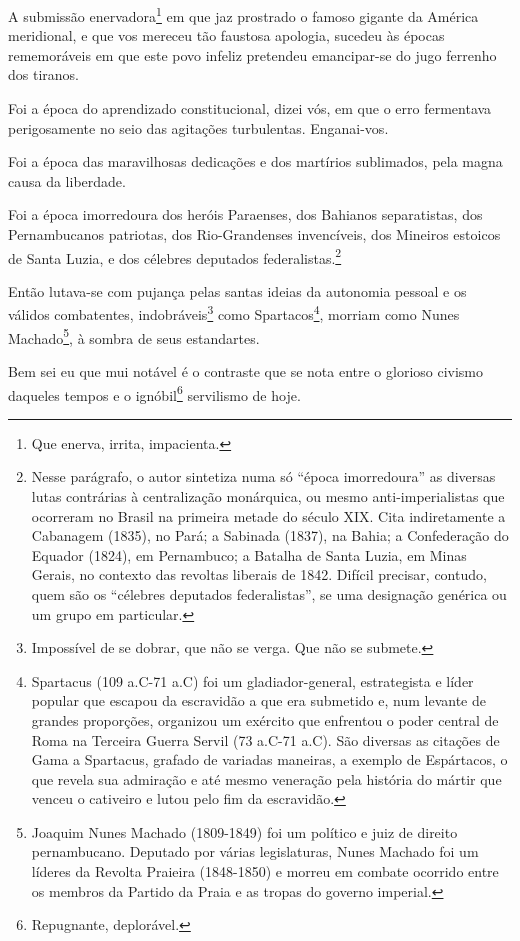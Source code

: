 A submissão enervadora\footnote{Que enerva, irrita, impacienta.} em
que jaz prostrado o famoso gigante da América meridional, e que vos
mereceu tão faustosa apologia, sucedeu às épocas rememoráveis em que
este povo infeliz pretendeu emancipar-se do jugo ferrenho dos tiranos.

Foi a época do aprendizado constitucional, dizei vós, em que o erro
fermentava perigosamente no seio das agitações turbulentas. Enganai-vos.

Foi a época das maravilhosas dedicações e dos martírios sublimados, pela
magna causa da liberdade.

Foi a época imorredoura dos heróis Paraenses, dos Bahianos separatistas,
dos Pernambucanos patriotas, dos Rio-Grandenses invencíveis, dos
Mineiros estoicos de Santa Luzia, e dos célebres deputados
federalistas.\footnote{Nesse parágrafo, o autor sintetiza numa só
  ``época imorredoura'' as diversas lutas contrárias à centralização
  monárquica, ou mesmo anti-imperialistas que ocorreram no Brasil na
  primeira metade do século XIX. Cita indiretamente a Cabanagem (1835),
  no Pará; a Sabinada (1837), na Bahia; a Confederação do Equador
  (1824), em Pernambuco; a Batalha de Santa Luzia, em Minas Gerais, no
  contexto das revoltas liberais de 1842. Difícil precisar, contudo,
  quem são os ``célebres deputados federalistas'', se uma designação
  genérica ou um grupo em particular.}

Então lutava-se com pujança pelas santas ideias da autonomia pessoal e
os válidos combatentes, indobráveis\footnote{Impossível de se dobrar,
  que não se verga. Que não se submete.} como Spartacos\footnote{
  Spartacus (109 a.C-71 a.C) foi um gladiador-general, estrategista e
  líder popular que escapou da escravidão a que era submetido e, num
  levante de grandes proporções, organizou um exército que enfrentou o
  poder central de Roma na Terceira Guerra Servil (73 a.C-71 a.C). São
  diversas as citações de Gama a Spartacus, grafado de variadas
  maneiras, a exemplo de Espártacos, o que revela sua admiração e até
  mesmo veneração pela história do mártir que venceu o cativeiro e lutou
  pelo fim da escravidão.}, morriam como Nunes Machado\footnote{
  Joaquim Nunes Machado (1809-1849) foi um político e juiz de direito
  pernambucano. Deputado por várias legislaturas, Nunes Machado foi um
  líderes da Revolta Praieira (1848-1850) e morreu em combate ocorrido
  entre os membros da Partido da Praia e as tropas do governo imperial.},
à sombra de seus estandartes.

Bem sei eu que mui notável é o contraste que se nota entre o glorioso
civismo daqueles tempos e o ignóbil\footnote{Repugnante, deplorável.}
servilismo de hoje.

